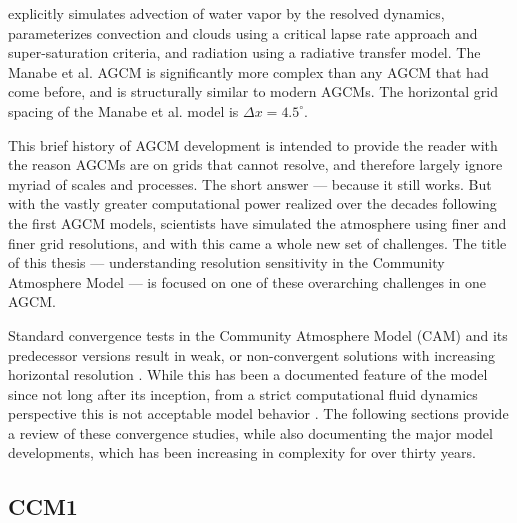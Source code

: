 \cite{METAL1965MWR} explicitly simulates advection of water vapor by the resolved dynamics, parameterizes convection and clouds using a critical lapse rate approach and super-saturation criteria, and radiation using a radiative transfer model. The Manabe et al. AGCM is significantly more complex than any AGCM that had come before, and is structurally similar to modern AGCMs. The horizontal grid spacing of the Manabe et al. model is $\Delta x = 4.5^{\circ}$.

This brief history of AGCM development is intended to provide the reader with the reason AGCMs are on grids that cannot resolve, and therefore largely ignore myriad of scales and processes. The short answer --- because it still works. But with the vastly greater computational power realized over the decades following the first AGCM models, scientists have simulated the atmosphere using finer and finer grid resolutions, and with this came a whole new set of challenges. The title of this thesis --- understanding resolution sensitivity in the Community Atmosphere Model --- is focused on one of these overarching challenges in one AGCM. 

Standard convergence tests in the Community Atmosphere Model (CAM) and its predecessor versions result in weak, or non-convergent solutions with increasing horizontal resolution \citep{KW1991JGR,WETAL1995CD,W1999T,W2008TELLUS,LETAL2011TELLUS,RJ2011MWR,RETAL2012ASL,OETAL2013JCLIM,RETAL2013JCLIM,ZetAl2014JCb,LETAL2015JCLIM}. While this has been a documented feature of the model since not long after its inception, from a strict computational fluid dynamics perspective this is not acceptable model behavior \citep{W2008TELLUS}. The following sections provide a review of these convergence studies, while also documenting the major model developments, which has been increasing in complexity for over thirty years.

\subsection{CCM1}

